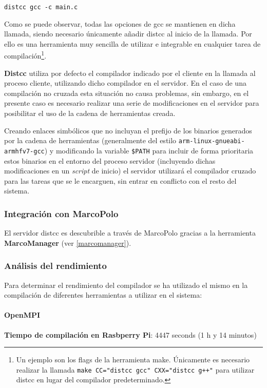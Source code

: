 \texttt{distcc gcc -c main.c}

Como se puede observar, todas las opciones de gcc se mantienen en dicha llamada, siendo necesario únicamente añadir distcc al inicio de la llamada. Por ello es una herramienta muy sencilla de utilizar e integrable en cualquier tarea de compilación\footnote{Un ejemplo son los flags de la herramienta make. Únicamente es necesario realizar la llamada \texttt{make CC="distcc gcc" CXX="distcc g++"} para utilizar distcc en lugar del compilador predeterminado.}.

\textbf{Distcc} utiliza por defecto el compilador indicado por el cliente en la llamada al proceso cliente, utilizando dicho compilador en el servidor. En el caso de una compilación no cruzada esta situación no causa problemas, sin embargo, en el presente caso es necesario realizar una serie de modificaciones en el servidor para posibilitar el uso de la cadena de herramientas creada.

Creando enlaces simbólicos que no incluyan el prefijo de los binarios generados por la cadena de herramientas (generalmente del estilo \texttt{arm-linux-gnueabi-armhfv7-gcc}) y modificando la variable \texttt{\$PATH} para incluir de forma prioritaria estos binarios en el entorno del proceso servidor (incluyendo dichas modificaciones en un \textit{script} de inicio) el servidor utilizará el compilador cruzado para las tareas que se le encarguen, sin entrar en conflicto con el resto del sistema.

\subsubsection{Integración con MarcoPolo}

El servidor distcc es descubrible a través de MarcoPolo gracias a la herramienta \textbf{MarcoManager} (ver \ref{marcomanager}).

\subsubsection{Análisis del rendimiento}

Para determinar el rendimiento del compilador se ha utilizado el mismo en la compilación de diferentes herramientas a utilizar en el sistema:

\paragraph{OpenMPI}

\textbf{Tiempo de compilación en Rasbperry Pi}: 4447 seconds (1 h y 14 minutos)

